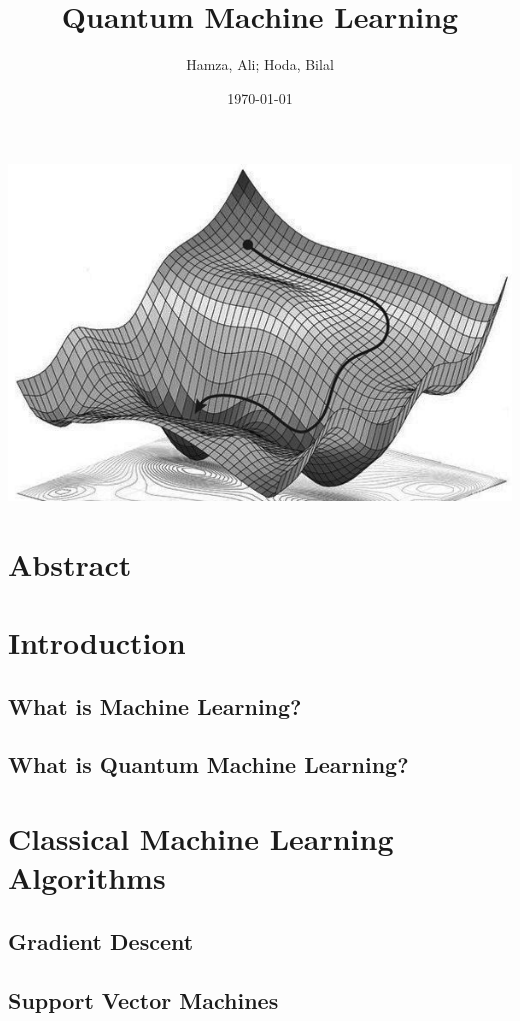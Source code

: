\documentclass[hidelinks,12pt]{article}
\title{Quantum Machine Learning}
\author{Hamza, Ali; Hoda, Bilal}
\date{\today}
\begin{document}
\maketitle

\begin{center}
    \includegraphics[scale = 0.7]{images/title2.jpg}
\end{center}
\newpage

\tableofcontents
\newpage

\section{Abstract}
\newpage
\section{Introduction}
\subsection{What is Machine Learning?}
\subsection{What is Quantum Machine Learning?}

\newpage
\section{Classical Machine Learning Algorithms}
\subsection{Gradient Descent}
\subsection{Support Vector Machines}
\end{document}
